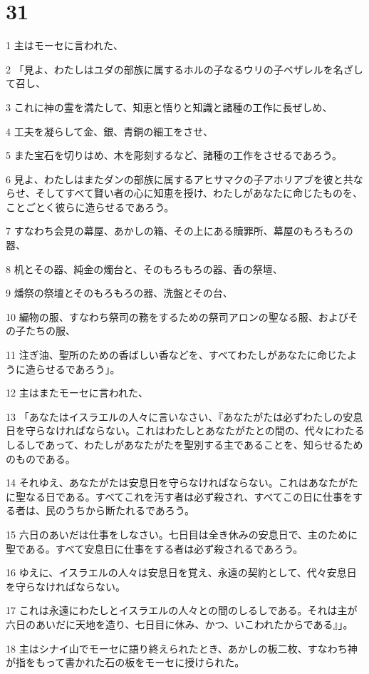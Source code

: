 \chapter{31}

\par 1 主はモーセに言われた、
\par 2 「見よ、わたしはユダの部族に属するホルの子なるウリの子ベザレルを名ざして召し、
\par 3 これに神の霊を満たして、知恵と悟りと知識と諸種の工作に長ぜしめ、
\par 4 工夫を凝らして金、銀、青銅の細工をさせ、
\par 5 また宝石を切りはめ、木を彫刻するなど、諸種の工作をさせるであろう。
\par 6 見よ、わたしはまたダンの部族に属するアヒサマクの子アホリアブを彼と共ならせ、そしてすべて賢い者の心に知恵を授け、わたしがあなたに命じたものを、ことごとく彼らに造らせるであろう。
\par 7 すなわち会見の幕屋、あかしの箱、その上にある贖罪所、幕屋のもろもろの器、
\par 8 机とその器、純金の燭台と、そのもろもろの器、香の祭壇、
\par 9 燔祭の祭壇とそのもろもろの器、洗盤とその台、
\par 10 編物の服、すなわち祭司の務をするための祭司アロンの聖なる服、およびその子たちの服、
\par 11 注ぎ油、聖所のための香ばしい香などを、すべてわたしがあなたに命じたように造らせるであろう」。
\par 12 主はまたモーセに言われた、
\par 13 「あなたはイスラエルの人々に言いなさい、『あなたがたは必ずわたしの安息日を守らなければならない。これはわたしとあなたがたとの間の、代々にわたるしるしであって、わたしがあなたがたを聖別する主であることを、知らせるためのものである。
\par 14 それゆえ、あなたがたは安息日を守らなければならない。これはあなたがたに聖なる日である。すべてこれを汚す者は必ず殺され、すべてこの日に仕事をする者は、民のうちから断たれるであろう。
\par 15 六日のあいだは仕事をしなさい。七日目は全き休みの安息日で、主のために聖である。すべて安息日に仕事をする者は必ず殺されるであろう。
\par 16 ゆえに、イスラエルの人々は安息日を覚え、永遠の契約として、代々安息日を守らなければならない。
\par 17 これは永遠にわたしとイスラエルの人々との間のしるしである。それは主が六日のあいだに天地を造り、七日目に休み、かつ、いこわれたからである』」。
\par 18 主はシナイ山でモーセに語り終えられたとき、あかしの板二枚、すなわち神が指をもって書かれた石の板をモーセに授けられた。

